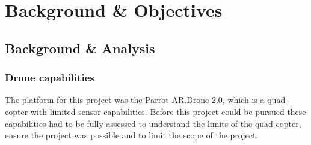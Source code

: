 \chapter{Background \& Objectives}
\vspace{-20pt}


   
   
\section{Background \& Analysis}

%

\subsection{Drone capabilities}
The platform for this project was the Parrot AR.Drone 2.0, which is a quad-copter with limited sensor capabilities. Before this project could be pursued these capabilities had to be fully assessed to understand the limits of the quad-copter, ensure the project was possible and to limit the scope of the project.


